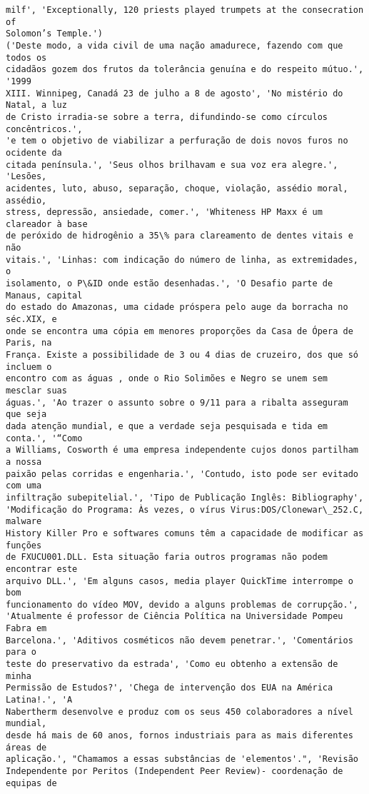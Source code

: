 \documentclass[10pt]{article}
\begin{document}
\begin{Verbatim}[commandchars=\\\{\}]
milf', 'Exceptionally, 120 priests played trumpets at the consecration of
Solomon’s Temple.')
('Deste modo, a vida civil de uma nação amadurece, fazendo com que todos os
cidadãos gozem dos frutos da tolerância genuína e do respeito mútuo.', '1999
XIII. Winnipeg, Canadá 23 de julho a 8 de agosto', 'No mistério do Natal, a luz
de Cristo irradia-se sobre a terra, difundindo-se como círculos concêntricos.',
'e tem o objetivo de viabilizar a perfuração de dois novos furos no ocidente da
citada península.', 'Seus olhos brilhavam e sua voz era alegre.', 'Lesões,
acidentes, luto, abuso, separação, choque, violação, assédio moral, assédio,
stress, depressão, ansiedade, comer.', 'Whiteness HP Maxx é um clareador à base
de peróxido de hidrogênio a 35\% para clareamento de dentes vitais e não
vitais.', 'Linhas: com indicação do número de linha, as extremidades, o
isolamento, o P\&ID onde estão desenhadas.', 'O Desafio parte de Manaus, capital
do estado do Amazonas, uma cidade próspera pelo auge da borracha no séc.XIX, e
onde se encontra uma cópia em menores proporções da Casa de Ópera de Paris, na
França. Existe a possibilidade de 3 ou 4 dias de cruzeiro, dos que só incluem o
encontro com as águas , onde o Rio Solimões e Negro se unem sem mesclar suas
águas.', 'Ao trazer o assunto sobre o 9/11 para a ribalta asseguram que seja
dada atenção mundial, e que a verdade seja pesquisada e tida em conta.', '“Como
a Williams, Cosworth é uma empresa independente cujos donos partilham a nossa
paixão pelas corridas e engenharia.', 'Contudo, isto pode ser evitado com uma
infiltração subepitelial.', 'Tipo de Publicação Inglês: Bibliography',
'Modificação do Programa: Às vezes, o vírus Virus:DOS/Clonewar\_252.C, malware
History Killer Pro e softwares comuns têm a capacidade de modificar as funções
de FXUCU001.DLL. Esta situação faria outros programas não podem encontrar este
arquivo DLL.', 'Em alguns casos, media player QuickTime interrompe o bom
funcionamento do vídeo MOV, devido a alguns problemas de corrupção.',
'Atualmente é professor de Ciência Política na Universidade Pompeu Fabra em
Barcelona.', 'Aditivos cosméticos não devem penetrar.', 'Comentários para o
teste do preservativo da estrada', 'Como eu obtenho a extensão de minha
Permissão de Estudos?', 'Chega de intervenção dos EUA na América Latina!.', 'A
Nabertherm desenvolve e produz com os seus 450 colaboradores a nível mundial,
desde há mais de 60 anos, fornos industriais para as mais diferentes áreas de
aplicação.', "Chamamos a essas substâncias de 'elementos'.", 'Revisão
Independente por Peritos (Independent Peer Review)- coordenação de equipas de

\end{Verbatim}
\end{document}
